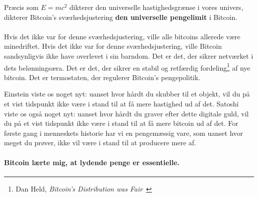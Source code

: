 Præcis som $E=mc^2$ dikterer den universelle hastighedsgrænse i vores univers,
dikterer Bitcoin's sværhedsjustering \textbf{den universelle pengelimit}
i Bitcoin.

\paragraph{}
Hvis det ikke var for denne sværhedsjustering, ville alle bitcoins allerede være minedriftet.
Hvis det ikke var for denne sværhedsjustering, ville Bitcoin sandsynligvis ikke
have overlevet i sin barndom. Det er det, der sikrer netværket i dets belønningsæra.
Det er det, der sikrer en stabil og retfærdig fordeling\footnote{Dan Held,
\textit{Bitcoin's Distribution was Fair}~\cite{distribution-was-fair}} af nye
bitcoin. Det er termostaten, der regulerer Bitcoin's pengepolitik.

Einstein viste os noget nyt: uanset hvor hårdt du skubber til et
objekt, vil du på et vist tidspunkt ikke være i stand til at få mere hastighed ud af
det. Satoshi viste os også noget nyt: uanset hvor hårdt du graver
efter dette digitale guld, vil du på et vist tidspunkt ikke være i stand til at få mere
bitcoin ud af det. For første gang i menneskets historie har vi en
pengemæssig vare, som uanset hvor meget du prøver, ikke vil være i stand til
at producere mere af.

\paragraph{Bitcoin lærte mig, at lydende penge er essentielle.}

%
%
%
%
%
%
%
%
